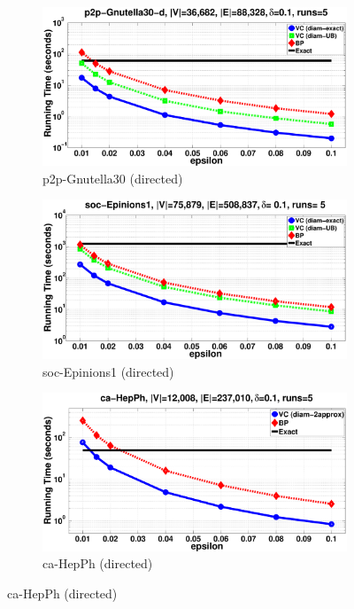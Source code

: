 \begin{figure}[htbp]
  \centering
  \begin{subfigure}[b]{1\textwidth}
    \includegraphics[width=1\textwidth,height=0.19\textheight]{figures/eps/p2p-Gnutella30-time}
    \caption{p2p-Gnutella30 (directed)}
    \label{fig:gnutella:time}
  \end{subfigure}

  \begin{subfigure}[b]{1\textwidth}
    \includegraphics[width=1\textwidth,height=0.19\textheight]{figures/eps/soc-Epinions1-time}
    \caption{soc-Epinions1 (directed)}
    \label{fig:Epinions:time}
  \end{subfigure}

  \begin{subfigure}[b]{1\textwidth}
    \includegraphics[width=1\textwidth,height=0.19\textheight]{figures/eps/ca-HepPh-time}
    \caption{ca-HepPh (directed)}
    \label{fig:HepPh:time}
  \end{subfigure}


\end{figure}
